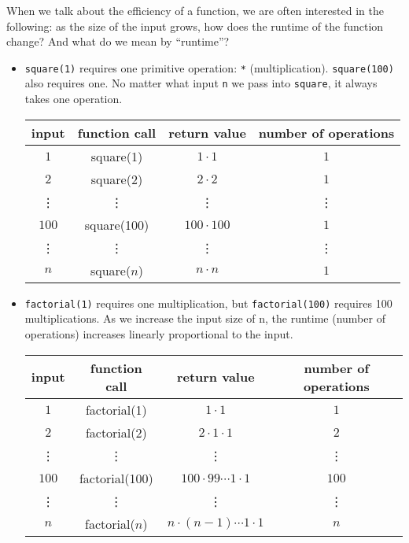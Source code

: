 \newcommand{\growth}{\Theta}

When we talk about the efficiency of a function, we are often interested in the
following: as the size of the input grows, how does the runtime of the function
change? And what do we mean by ``runtime''?

\begin{itemize}
\item  \lstinline$square(1)$ requires one primitive operation: \lstinline$*$
    (multiplication). \lstinline$square(100)$ also requires one. No matter
    what input \lstinline$n$ we pass into \lstinline$square$, it always takes one
    operation.
    \begin{center}
    \begin{tabular}{ |c|c|c|c| }
        \hline
        input & function call & return value & number of operations\\
        \hline
        $1$   & square(1)     & $1\cdot 1$          & $1$          \\
        $2$   & square(2)     & $2\cdot 2$          & $1$          \\
        \vdots& \vdots        & \vdots              & \vdots       \\
        $100$ & square(100)   & $100\cdot 100$      & $1$          \\
        \vdots& \vdots        & \vdots              & \vdots       \\
        $n$   & square($n$)   & $n\cdot n$          & $1$          \\
        \hline
    \end{tabular}
    \end{center}
\item
    \lstinline$factorial(1)$ requires one multiplication, but
    \lstinline$factorial(100)$ requires 100 multiplications. As we increase the
    input size of n, the runtime (number of operations) increases linearly
    proportional to the input.
    \begin{center}
    \begin{tabular}{ |c|c|c|c| }
      \hline
      input & function call & return value & number of operations\\
      \hline
      $1$   & factorial(1)    & $1\cdot 1$                    & $1$   \\
      $2$   & factorial(2)    & $2\cdot 1\cdot 1$             & $2$   \\
      \vdots& \vdots          & \vdots                        & \vdots\\
      $100$ & factorial(100)  & $100\cdot 99\cdots 1\cdot 1$  & $100$ \\
      \vdots& \vdots          & \vdots                        & \vdots\\
      $n$   & factorial($n$)  & $n\cdot (n-1)\cdots 1\cdot 1$ & $n$   \\
      \hline
    \end{tabular}
    \end{center}
\end{itemize}
